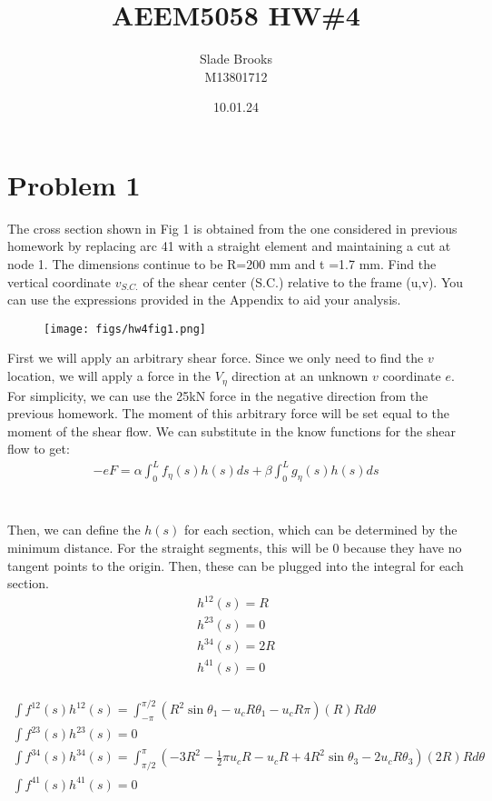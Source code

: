 \documentclass[12 pt]{article}
\title{AEEM5058 HW\#4}
\date{10.01.24}
\author{Slade Brooks \\ M13801712}
\begin{document}
\maketitle

\section*{Problem 1}
The cross section shown in Fig 1 is obtained from the one considered in previous homework by
replacing arc 41 with a straight element and maintaining a cut at node 1. The dimensions continue
to be R=200 mm and t =1.7 mm. Find the vertical coordinate $v_{S.C.}$ of the shear center (S.C.) relative
to the frame (u,v). You can use the expressions provided in the Appendix to aid your analysis.
\begin{figure}[!hbtp]
    \centering
    \texttt{[image: figs/hw4fig1.png]}
\end{figure} \par
\pagebreak
First we will apply an arbitrary shear force. Since we only need to find the $v$ location, we will apply a force in the
$V_\eta$ direction at an unknown $v$ coordinate $e$. For simplicity, we can use the 25kN force in the negative direction
from the previous
homework. The moment of this arbitrary force will be set equal to the moment of the shear flow. We can substitute in the
know functions for the shear flow to get:
\begin{align*}
    -eF=\alpha \int_{0}^{L}{f_{\eta}(s)h(s)ds} + \beta \int_{0}^{L}{g_{\eta}(s)h(s)ds}
\end{align*} \\ \\
Then, we can define the $h(s)$ for each section, which can be determined by the minimum distance. For the straight
segments, this will be 0 because they have no tangent points to the origin. Then, these can be plugged into the integral
for each section.
\begin{align*}
    h^{12}(s)=R \\
    h^{23}(s)=0 \\
    h^{34}(s)=2R \\
    h^{41}(s)=0
\end{align*} \\
\begin{align*}
    \int{f^{12}(s)h^{12}(s)}=\int_{-\pi}^{\pi/2}(R^2\sin{\theta_1}-u_cR\theta_1-u_cR\pi)(R)Rd\theta \\
    \int{f^{23}(s)h^{23}(s)}=0 \\
    \int{f^{34}(s)h^{34}(s)}=\int_{\pi/2}^{\pi}(-3R^2-\frac{1}{2}\pi u_cR-u_cR+4R^2\sin{\theta_3}-2u_cR\theta_3)(2R)Rd\theta \\
    \int{f^{41}(s)h^{41}(s)}=0
\end{align*}
\end{document}

